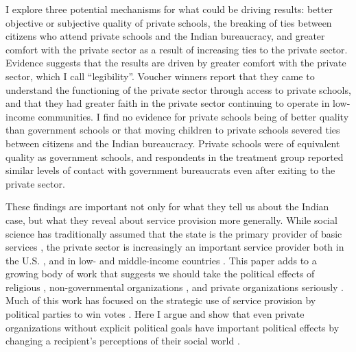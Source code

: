 \documentclass[hidelinks, 12pt, titlepage]{article}
\begin{document}
	I explore three potential mechanisms for what could be driving results: better objective or subjective quality of private schools, the breaking of ties between citizens who attend private schools and the Indian bureaucracy, and greater comfort with the private sector as a result of increasing ties to the private sector.  Evidence suggests that the results are driven by greater comfort with the private sector, which I call ``legibility''.  Voucher winners report that they came to understand the functioning of the private sector through access to private schools, and that they had greater faith in the private sector continuing to operate in low-income communities.  I find no evidence for private schools being of better quality than government schools or that moving children to private schools severed ties between citizens and the Indian bureaucracy.  Private schools were of equivalent quality as government schools, and respondents in the treatment group reported similar levels of contact with government bureaucrats even after exiting to the private sector.

	These findings are important not only for what they tell us about the Indian case, but what they reveal about service provision more generally.  While social science has traditionally assumed that the state is the primary provider of basic services \citep{Post2018}, the private sector is increasingly an important service provider both in the U.S. \citep{Morgan2011a}, and in low- and middle-income countries \citep{Cammett2011}.  This paper adds to a growing body of work that suggests we should take the political effects of religious \citep{Clark2004a,Thachil2011,Thachil2014a}, non-governmental organizations \citep{Boulding2014,Bratton1989}, and private organizations seriously \citep{Lerman2013}.  Much of this work has focused on the strategic use of service provision by political parties to win votes \citep{Cammett2010,Clark2004a,Thachil2014,Thachil2014a}.  Here I argue and show that even private organizations without explicit political goals have important political effects by changing a recipient's perceptions of their social world \citep{Lerman2013}.
\end{document}

